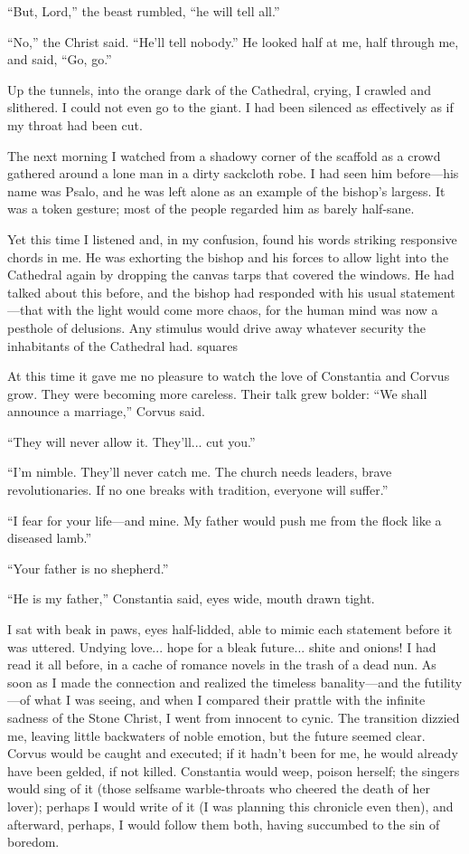 “But, Lord,” the beast rumbled, “he will tell all.”

“No,” the Christ said. “He’ll tell nobody.” He looked half at me, half through me, and said, “Go, go.”

Up the tunnels, into the orange dark of the Cathedral, crying, I crawled and slithered. I could not even go to the giant. I had been silenced as effectively as if my throat had been cut.

The next morning I watched from a shadowy corner of the scaffold as a crowd gathered around a lone man in a dirty sackcloth robe. I had seen him before—his name was Psalo, and he was left alone as an example of the bishop’s largess. It was a token gesture; most of the people regarded him as barely half-sane.

Yet this time I listened and, in my confusion, found his words striking responsive chords in me. He was exhorting the bishop and his forces to allow light into the Cathedral again by dropping the canvas tarps that covered the windows. He had talked about this before, and the bishop had responded with his usual statement—that with the light would come more chaos, for the human mind was now a pesthole of delusions. Any stimulus would drive away whatever security the inhabitants of the Cathedral had.
squares

At this time it gave me no pleasure to watch the love of Constantia and Corvus grow. They were becoming more careless. Their talk grew bolder: “We shall announce a marriage,” Corvus said.

“They will never allow it. They’ll... cut you.”

“I’m nimble. They’ll never catch me. The church needs leaders, brave revolutionaries. If no one breaks with tradition, everyone will suffer.”

“I fear for your life—and mine. My father would push me from the flock like a diseased lamb.”

“Your father is no shepherd.”

“He is my father,” Constantia said, eyes wide, mouth drawn tight.

I sat with beak in paws, eyes half-lidded, able to mimic each statement before it was uttered. Undying love... hope for a bleak future... shite and onions! I had read it all before, in a cache of romance novels in the trash of a dead nun. As soon as I made the connection and realized the timeless banality—and the futility—of what I was seeing, and when I compared their prattle with the infinite sadness of the Stone Christ, I went from innocent to cynic. The transition dizzied me, leaving little backwaters of noble emotion, but the future seemed clear. Corvus would be caught and executed; if it hadn’t been for me, he would already have been gelded, if not killed. Constantia would weep, poison herself; the singers would sing of it (those selfsame warble-throats who cheered the death of her lover); perhaps I would write of it (I was planning this chronicle even then), and afterward, perhaps, I would follow them both, having succumbed to the sin of boredom.

